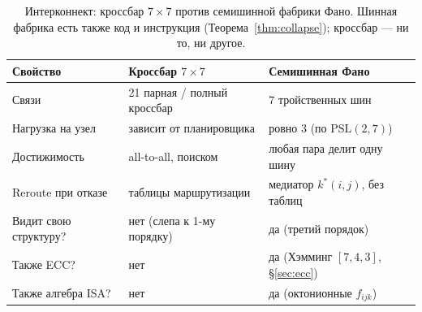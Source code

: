 \begin{table}[H]
\centering\small
\caption{Интерконнект: кроссбар $7\times7$ против семишинной фабрики Фано.
Шинная фабрика есть также код и инструкция (Теорема~\ref{thm:collapse}); кроссбар
--- ни то, ни другое.}
\label{tab:crossbar-vs-fano}
\begin{tabular}{@{}p{3.6cm}p{3.6cm}p{4.5cm}@{}}
\toprule
\textbf{Свойство} & \textbf{Кроссбар $7\times7$} & \textbf{Семишинная Фано} \\
\midrule
Связи & 21 парная / полный кроссбар & 7 тройственных шин \\
Нагрузка на узел & зависит от планировщика & ровно 3 (по $\mathrm{PSL}(2,7)$) \\
Достижимость & all-to-all, поиском & любая пара делит одну шину \\
Reroute при отказе & таблицы маршрутизации & медиатор $k^\ast(i,j)$, без таблиц \\
Видит свою структуру? & нет (слепа к 1-му порядку) & да (третий порядок) \\
Также ECC? & нет & да (Хэмминг $[7,4,3]$, \S\ref{sec:ecc}) \\
Также алгебра ISA? & нет & да (октонионные $f_{ijk}$) \\
\bottomrule
\end{tabular}
\end{table}
